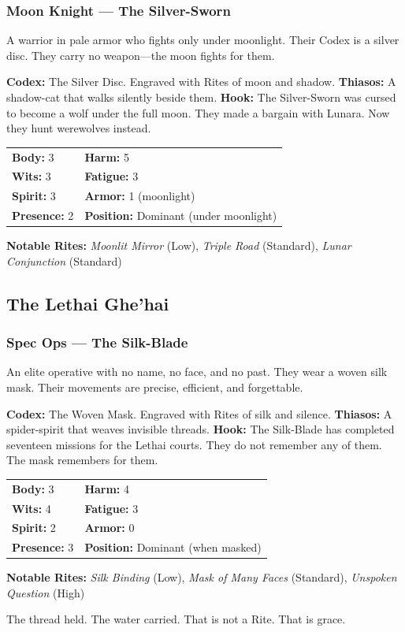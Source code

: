 \subsubsection{Moon Knight — The Silver-Sworn}

A warrior in pale armor who fights only under moonlight. Their Codex is a silver disc. They carry no weapon—the moon fights for them.

\textbf{Codex:} The Silver Disc. Engraved with Rites of moon and shadow.
\textbf{Thiasos:} A shadow-cat that walks silently beside them.
\textbf{Hook:} The Silver-Sworn was cursed to become a wolf under the full moon. They made a bargain with Lunara. Now they hunt werewolves instead.

\begin{tabular}{ll}
\textbf{Body:} 3 & \textbf{Harm:} 5 \\
\textbf{Wits:} 3 & \textbf{Fatigue:} 3 \\
\textbf{Spirit:} 3 & \textbf{Armor:} 1 (moonlight) \\
\textbf{Presence:} 2 & \textbf{Position:} Dominant (under moonlight) \\
\end{tabular}

\textbf{Notable Rites:} \textit{Moonlit Mirror} (Low), \textit{Triple Road} (Standard), \textit{Lunar Conjunction} (Standard)

\subsection{The Lethai Ghe'hai}

\subsubsection{Spec Ops — The Silk-Blade}

An elite operative with no name, no face, and no past. They wear a woven silk mask. Their movements are precise, efficient, and forgettable.

\textbf{Codex:} The Woven Mask. Engraved with Rites of silk and silence.
\textbf{Thiasos:} A spider-spirit that weaves invisible threads.
\textbf{Hook:} The Silk-Blade has completed seventeen missions for the Lethai courts. They do not remember any of them. The mask remembers for them.

\begin{tabular}{ll}
\textbf{Body:} 3 & \textbf{Harm:} 4 \\
\textbf{Wits:} 4 & \textbf{Fatigue:} 3 \\
\textbf{Spirit:} 2 & \textbf{Armor:} 0 \\
\textbf{Presence:} 3 & \textbf{Position:} Dominant (when masked) \\
\end{tabular}

\textbf{Notable Rites:} \textit{Silk Binding} (Low), \textit{Mask of Many Faces} (Standard), \textit{Unspoken Question} (High)

The thread held. The water carried. That is not a Rite. That is grace.
